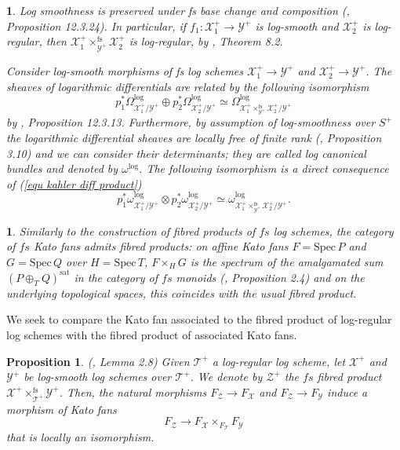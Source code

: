 \documentclass{amsart}%
\numberwithin{equation}{subsection}
\theoremstyle{plain2}
\newtheorem{prop}[equation]{Proposition}
\theoremstyle{definition2}
\theoremstyle{stepstyle}
\theoremstyle{point}
\theoremstyle{subpoint}
\newtheorem{subpoint}[equation]{}%
\newcommand{\spa}[1]{\begin{subpoint}#1\end{subpoint}}           %
\newcommand{\cX}{\ensuremath{\mathscr{X}}}
\newcommand{\cY}{\ensuremath{\mathscr{Y}}}
\newcommand{\cZ}{\ensuremath{\mathscr{Z}}}
\renewcommand{\cZ}{\ensuremath{\mathscr{Z}}}
\renewcommand{\cY}{\ensuremath{\mathscr{Y}}}
\newcommand{\Spec}{\ensuremath{\mathrm{Spec}\,}}
\begin{document}
\spa{Log smoothness is preserved under fs base change and composition (\cite{GabberRamero}, Proposition 12.3.24). In particular, if $f_1: \cX_1^+ \rightarrow \cY^+$ is log-smooth and $\cX_2^+$ is log-regular, then $\cX_1^+\times^{\text{fs}}_{\cY^+} \cX_2^+$ is log-regular, by \cite{Kato1994a}, Theorem 8.2.

Consider log-smooth morphisms of fs log schemes $\cX_1^+ \rightarrow \cY^+$ and $\cX_2^+ \rightarrow \cY^+$. The sheaves of logarithmic differentials are related by the following isomorphism \begin{equation} \label{equ kahler diff product}
p_1^* \Omega^{\log}_{\cX_1^+/\cY^+} \oplus p_2^* \Omega^{\log}_{\cX_2^+/ \cY^+} \simeq \Omega^{\log}_{\cX_1^+\times^{\text{fs}}_{\cY^+} \cX_2^+ /\cY^+}\end{equation} by \cite{GabberRamero}, Proposition 12.3.13. Furthermore, by assumption of log-smoothness over $S^+$ the logarithmic differential sheaves are locally free of finite rank (\cite{Kato1994a}, Proposition 3.10) and we can consider their determinants; they are called log canonical bundles and denoted by $\omega^{\log}$. The following isomorphism is a direct consequence of (\ref{equ kahler diff product}) \begin{equation} \label{equ log can bundles}
p_1^* \omega^{\log}_{\cX_1^+/\cY^+} \otimes p_2^* \omega^{\log}_{\cX_2^+/ \cY^+} \simeq \omega^{\log}_{\cX_1^+\times^{\text{fs}}_{\cY^+} \cX_2^+ /\cY^+}.\end{equation} }

\spa{Similarly to the construction of fibred products of $fs$ log schemes, the category of $fs$ Kato fans admits fibred products: on affine Kato fans $F=\Spec P$ and $G=\Spec Q$ over $H=\Spec T$, $F\times_{H}G$ is the spectrum of the amalgamated sum $(P \oplus_T Q)^{\text{sat}}$ in the category of $fs$ monoids (\cite{Ulirsch2016}, Proposition 2.4) and on the underlying topological spaces, this coincides with the usual fibred product.}
We seek to compare the Kato fan associated to the fibred product of log-regular log schemes with the fibred product of associated Kato fans.
\begin{prop} \label{local isomo kato fan product}(\cite{Saito2004}, Lemma 2.8) Given $\mathscr{T}^+$ a log-regular log scheme, let $\cX^+$ and $\cY^+$ be log-smooth log schemes over $\mathscr{T}^+$. We denote by $\cZ^+$ the $fs$ fibred product $\cX^+\times^{\text{fs}}_{\mathscr{T}^+} \cY^+$. Then, the natural morphisms $F_{\cZ}\to F_{\cX}$ and $F_{\cZ}\to F_{\cY}$ induce a morphism of Kato fans \begin{equation} \label{equ local isomo kato fans}
F_{\cZ} \rightarrow F_{\cX} \times_{F_{\mathscr{T}}} F_{\cY}
\end{equation} that is locally an isomorphism.
\end{prop}
\end{document}
